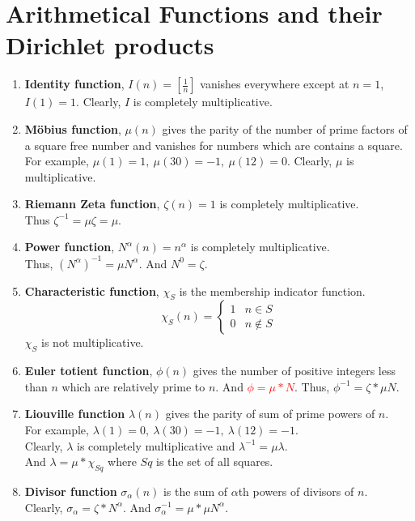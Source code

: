 \section{Arithmetical Functions and their Dirichlet products}
\begin{enumerate}
	\item \textbf{Identity function}, $I(n) = \left[\frac{1}{n}\right]$ vanishes everywhere except at $n = 1$, $I(1) = 1$.
	Clearly, $I$ is completely multiplicative.
	\item \textbf{M\"obius function}, $\mu(n)$ gives the parity of the number of prime factors of a square free number and vanishes for numbers which are contains a square.\\
	For example, $\mu(1) = 1,\ \mu(30) = -1,\ \mu(12) = 0$.
	Clearly, $\mu$ is multiplicative.
\item \textbf{Riemann Zeta function}, $\zeta(n) = 1$ is completely multiplicative.\\
	Thus $\zeta^{-1} = \mu \zeta = \mu$.
	\item \textbf{Power function}, $N^\alpha(n) = n^\alpha$ is completely multiplicative.\\
	Thus, $(N^\alpha)^{-1} = \mu N^\alpha$. And $N^0 = \zeta$.
	\item \textbf{Characteristic function}, $\chi_S$ is the membership indicator function.
	$$\chi_S(n) = \begin{cases} 1 & n \in S \\ 0 & n \notin S \end{cases}$$
	$\chi_S$ is not multiplicative.
	\item \textbf{Euler totient function}, $\phi(n)$ gives the number of positive integers less than $n$ which are relatively prime to $n$. And \textcolor{red}{$\phi = \mu \ast N$}. Thus, $\phi^{-1} = \zeta \ast \mu N$.
	\item \textbf{Liouville function} $\lambda(n)$ gives the parity of sum of prime powers of $n$.\\
	For example, $\lambda(1) = 0,\ \lambda(30)=-1,\ \lambda(12)=-1$.\\
	Clearly, $\lambda$ is completely multiplicative and $\lambda^{-1} = \mu \lambda$.\\
	And $\lambda = \mu \ast \chi_{Sq}$ where $Sq$ is the set of all squares.
	\item \textbf{Divisor function} $\sigma_\alpha(n)$ is the sum of $\alpha$th powers of divisors of $n$.\\ Clearly, $\sigma_\alpha = \zeta \ast N^\alpha$. And $\sigma_\alpha^{-1} = \mu \ast \mu N^\alpha$.

\end{enumerate}

